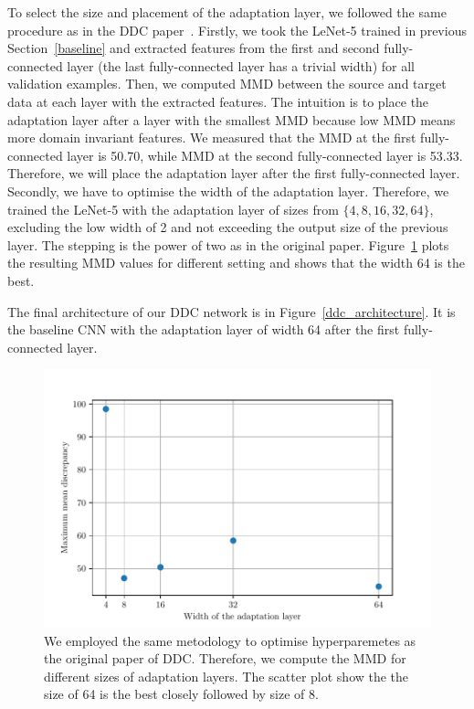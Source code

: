 To select the size and placement of the adaptation layer,
we followed the same procedure as in the DDC paper~\cite{tzeng2014}.
Firstly, we took the LeNet-5 trained in previous Section~\ref{baseline}
and extracted features from the first and second fully-connected layer
(the last fully-connected layer has a trivial width)
for all validation examples.
Then, we computed MMD between the source and target data at each layer with the extracted features.
The intuition is to place the adaptation layer after a layer with the smallest MMD
because low MMD means more domain invariant features.
We measured that the MMD at the first fully-connected layer is 50.70,
while MMD at the second fully-connected layer is 53.33.
Therefore, we will place the adaptation layer after the first fully-connected layer.
Secondly, we have to optimise the width of the adaptation layer.
Therefore, we trained the LeNet-5 with the adaptation layer of sizes
from \(\{4, 8, 16, 32, 64\}\), excluding the low width of 2
and not exceeding the output size of the previous layer.
The stepping is the power of two as in the original paper.
Figure~\ref{adaptation_layer} plots the resulting MMD values for different setting
and shows that the width 64 is the best.

The final architecture of our DDC network is in Figure~\ref{ddc_architecture}.
It is the baseline CNN with the adaptation layer of width 64
after the first fully-connected layer.

\begin{figure}
\includegraphics[width=\textwidth]{img/adaptation_layer_width.pdf}
\caption[Optimisation of the width of the adatpation layer]{
	We employed the same metodology to optimise hyperparemetes as the original paper of DDC.
	Therefore, we compute the MMD for different sizes of adaptation layers.
	The scatter plot show the the size of 64 is the best closely followed by size of 8.
}
\label{adaptation_layer}
\end{figure}

